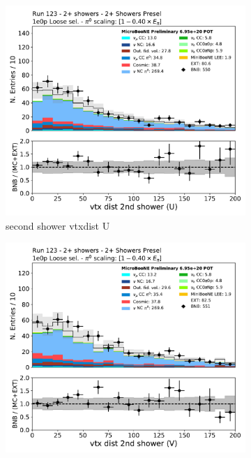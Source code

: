 \begin{figure}[H]
    \centering
    \begin{subfigure}{0.3\textwidth}
    \includegraphics[width=1.0\textwidth]{Sidebands/Figures/TwoShr_1e0pSel/loose/secondshower_U_vtxdist.pdf}
    \caption{second shower vtxdist U}
    \end{subfigure}
    \begin{subfigure}{0.3\textwidth}
    \includegraphics[width=1.0\textwidth]{Sidebands/Figures/TwoShr_1e0pSel/loose/secondshower_V_vtxdist.pdf}

\end{subfigure}
\end{figure}
